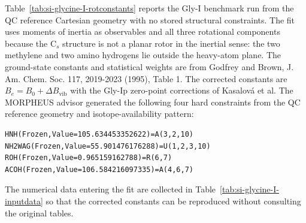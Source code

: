 \documentclass[12pt]{article}
\begin{document}
Table~\ref{tab:si-glycine-I-rotconstants} reports the Gly-I benchmark run from
the QC reference Cartesian geometry with no stored structural constraints. The fit uses
moments of inertia as observables and all three rotational components because
the C$_s$ structure is not a planar rotor in the inertial sense: the two
methylene and two amino hydrogens lie outside the heavy-atom plane. The
ground-state constants and statistical weights are from Godfrey and Brown,
J. Am. Chem. Soc. 117, 2019-2023 (1995), Table 1. The corrected constants are
$B_e=B_0+\Delta B_\mathrm{vib}$ with the Gly-Ip zero-point corrections of
Kasalov{\'a} et al. The MORPHEUS advisor generated the following four hard
constraints from the QC reference geometry and isotope-availability pattern:
\begin{verbatim}
HNH(Frozen,Value=105.634453352622)=A(3,2,10)
NH2WAG(Frozen,Value=55.901476176288)=U(1,2,3,10)
ROH(Frozen,Value=0.965159162788)=R(6,7)
ACOH(Frozen,Value=106.584216097335)=A(4,6,7)
\end{verbatim}
The numerical data entering the fit are collected in
Table~\ref{tab:si-glycine-I-inputdata} so that the corrected constants can be
reproduced without consulting the original tables.
\end{document}
